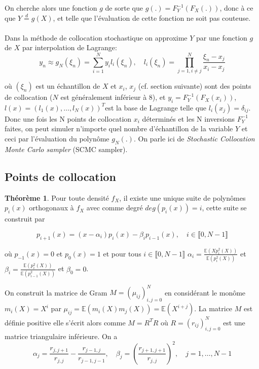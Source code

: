 \documentclass[a4paper,12pt]{report}
\numberwithin{equation}{section}
\theoremstyle{definition}
\newtheorem{theorem}{Théorème}[subsection]
\numberwithin{equation}{section}
\begin{document}
On cherche alors une fonction $g$ de sorte que  $g(.)=F_{Y}^{-1}(F_{X}(.))$, donc à ce que $Y\overset{d}{=}g(X)$, et telle que l'évaluation de cette fonction ne soit pas couteuse.\\\\
Dans la méthode de collocation stochastique \cite{Colloc} on approxime $Y$ par une fonction $g$ de $X$ par interpolation de Lagrange:$$y_{n}\approx g_{N}(\xi_{n})=\sum_{i=1}^{N}y_{i}l_{i}(\xi_{n}),\quad l_{i}(\xi_{n})=\prod_{j=1,i\neq j}^{N}\frac{\xi_{n}-x_{j}}{x_{i}-x_{j}}$$

où $(\xi_{n})$ est un échantillon de $ X$ et $x_{i}$, $x_{j}$ (cf. section suivante) sont des points de collocation ($N$ est généralement inférieur à 8), et $y_{i}=F_{Y}^{-1}(F_{X}(x_{i}))$, $l(x)=(l_{1}(x),\dots,l_{N}(x))^{T}$est la base de Lagrange telle que $l_{i}(x_{j})=\delta_{ij}$. Donc une fois les N points  de collocation  $x_{i}$ déterminés et les N inversions $F_{Y}^{-1}$ faites, on peut simuler n'importe quel nombre d'échantillon de la variable $Y$ et ceci par l'évaluation du polynôme $g_{N}(.)$. On parle ici de \textit{Stochastic Collocation Monte Carlo sampler} (SCMC sampler).
\subsection{Points de collocation} 
\begin{theorem}
\cite{Th1} Pour toute densité $f_{X}$, il existe une unique suite de polynômes $p_{i}(x)$ orthogonaux à $f_X$ avec comme degré $deg(p_{i}(x))=i$, cette suite se construit par

$$p_{i+1}(x)=(x-\alpha_{i})p_{i}(x)-\beta_{i}p_{i-1}(x),\quad i\in\llbracket0,N-1\rrbracket$$

où $p_{-1}(x)=0$ et $p_{0}(x)=1$ et pour tous $i\in\llbracket0,N-1\rrbracket$ $\alpha_{i}=\frac{\mathbb{E}(Xp_{i}^{2}(X))}{\mathbb{E}(p_{i}^{2}(X))}$ et $\beta_{i}=\frac{\mathbb{E}(p_{i}^{2}(X))}{\mathbb{E}(p_{i-1}^{2}(X))}$ et $\beta_{0}=0$.
\end{theorem}
\vspace*{0.3cm}
On construit la matrice de Gram $M=\left({\mu_{ij}}\right)_{i,j=0}^{N}$ en considérant le monôme $m_{i}(X)=X^{i}$ par $\mu_{ij}=\mathbb{E}(m_{i}(X)m_{j}(X))=\mathbb{E}(X^{i+j})$. La matrice $M $ est définie positive elle s'écrit alors comme $M=R^{T}R$ où $R=\left({r_{ij}}\right)_{i,j=0}^{N}$ est une matrice triangulaire inférieure. On a
$$\alpha_{j}=\frac{r_{j,j+1}}{r_{j,j}}-\frac{r_{j-1,j}}{r_{j-1,j-1}},\quad\beta_{j}=\left(\frac{r_{j+1,j+1}}{r_{j,j}}\right)^{2},\quad j=1,\dots,N-1$$
\end{document}
